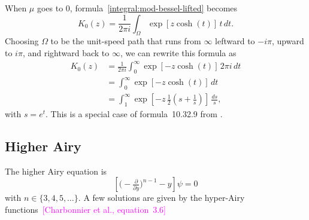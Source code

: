 \documentclass{article}
\theoremstyle{definition}
\begin{document}
When $\mu$ goes to $0$, formula~\eqref{integral:mod-bessel-lifted} becomes
\[ K_0(z) = \frac{1}{2\pi i} \int_\Omega \exp\left[z \cosh(t)\right]\,t\,dt. \]
Choosing $\Omega$ to be the unit-speed path that runs from $\infty$ leftward to $-i\pi$, upward to $i\pi$, and rightward back to $\infty$, we can rewrite this formula as
\begin{align*}
K_0(z) & = \frac{1}{2\pi i} \int_0^\infty \exp\left[-z \cosh(t)\right]\,2\pi i\,dt \\
& = \int_0^\infty \exp\left[-z \cosh(t)\right]\,dt \\
& = \int_1^\infty \exp\left[-z\,\tfrac{1}{2}\left(s + \tfrac{1}{s}\right)\right]\,\frac{ds}{s},
\end{align*}
with $s = e^t$. This is a special case of formula~10.32.9 from \cite{dlmf}.


\subsection{Higher Airy}

The higher Airy equation is
\begin{equation}\label{eqn:airy-lucas}
\left[\big({-}\tfrac{\partial}{\partial y}\big)^{n-1} - y\right] \psi = 0
\end{equation}
with $n \in \{3, 4, 5, \ldots\}$. A few solutions are given by the hyper-Airy functions~\textcolor{magenta}{[Charbonnier et al., equation~3.6]}
\end{document}
